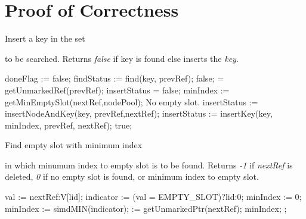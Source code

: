 \documentclass[11pt,onecolumn]{IEEEtran}
\begin{document}
\section{Proof of Correctness}

\begin{algorithm}
  \caption{Insert a key in the set}
  \label{alg:insert}
  \begin{algorithmic}[1]
    \Require
        to be searched.
    \Ensure
       \Statex Returns {\it false} if key is found else inserts the {\it key}.
               
    \Statex
      \State doneFlag := false;
        \State findStatus := find(key, prevRef);
          \State
          \Return false;
        \EndIf
         = getUnmarkedRef(prevRef);
          \State insertStatus = false;
          \State minIndex := getMinEmptySlot(nextRef,nodePool);
           \Comment No empty slot.
            \State insertStatus := insertNodeAndKey(key, prevRef,nextRef);
            \State insertStatus := insertKey(key, minIndex, prevRef, nextRef);
          \EndIf
            \State
            \Return true;
          \EndIf
        \EndIf
      \EndWhile
    \EndFunction
  \end{algorithmic}
\end{algorithm}

\begin{algorithm}
  \caption{Find empty slot with minimum index}
  \label{alg:minindex}
  \begin{algorithmic}[1]
    \Require
       in which minumum index to empty slot is to be
              found.
    \Ensure
      \Statex Returns {\it -1} if {\it nextRef} is deleted, {\it 0} if no
              empty slot is found, or minimum index to empty slot.  
    
      \State val := nextRef:V[lid];
      \State indicator := (val = EMPTY\_SLOT)?lid:0;
        \State minIndex := 0;
      \Else
        \State minIndex := simdMIN(indicator);
      \EndIf
       := getUnmarkedPtr(nextRef);
        \State
        \Return minIndex;
      \Else
        \State
        ;
      \EndIf  
    \EndFunction
  \end{algorithmic}
\end{algorithm}
\end{document}

